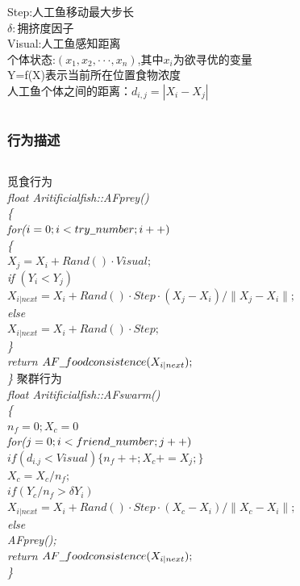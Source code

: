 \begin{frame}
\begin{columns}
		\tiny{Step:人工鱼移动最大步长\\{$\delta:$拥挤度因子}\\Visual:人工鱼感知距离\\个体状态:$(x_1,x_2,···,x_n)$,其中$x_i$为欲寻优的变量\\Y=f(X)表示当前所在位置食物浓度\\人工鱼个体之间的距离：$d_{i,j}=|X_i-X_j|$}
	\end{columns}
\end{frame}
\begin{frame}
	\frametitle{行为描述}
		\begin{columns}
		
		\small{觅食行为}\vspace{3ex}\\
			\flushleft\scriptsize{\emph{float Aritificial\underline{\hspace{0.5em}}fish::AF\underline{\hspace{0.5em}}prey()\\{\{}\\{\qquad for($i=0;i<try\underline{\hspace{0.5em}}number;i++)$}\\{\qquad\{}\\{\qquad\qquad$X_j=X_i+Rand()·Visual;$}\\{\qquad\qquad if $(Y_i<Y_j)$}\\{\qquad\qquad\qquad $X_{i|next}=X_i+Rand()·Step·(X_j-X_i)/\lVert X_j-X_i\rVert;$}\\{\qquad\qquad else}\\{\qquad\qquad\qquad $X_{i|next}=X_i+Rand()·Step;$}\\{\qquad\}}\\{ return $AF\underline{\hspace{0.5em}}foodconsistence(X_{i|next});$} \\{\}} }}
		\small{聚群行为}\vspace{3ex}\\
			\flushleft\scriptsize{\emph{float Aritificial\underline{\hspace{0.5em}}fish::AF\underline{\hspace{0.5em}}swarm() \\ {\{} \\ {\qquad $n_f=0;X_c=0$} \\ {\qquad for($j=0;i<friend\underline{\hspace{0.5em}}number;j++)$} \\ {\qquad\qquad $if(d_{i.j}<Visual) \{ n_f++;X_c+=X_j;\}$} \\ {\qquad $X_c=X_c/n_f;$}\\{\qquad $if (Y_c/n_f>\delta Y_i)$}\\{\qquad\qquad $X_{i|next}=X_i+Rand()·Step·(X_c-X_i)/\lVert X_c-X_i\rVert;$}\\{\qquad else}\\{\qquad\qquad AF\underline{\hspace{0.5em}}prey();}\\{ return $AF\underline{\hspace{0.5em}}foodconsistence(X_{i|next});$} \\{\}} }}

\end{columns}
\end{frame}
